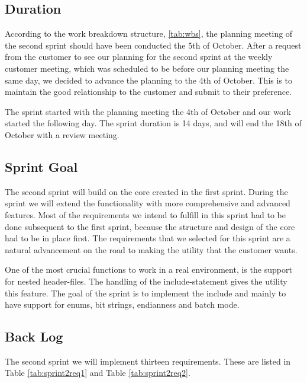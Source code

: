 \subsection{Duration}
According to the work breakdown structure, \autoref{tab:wbs}, the planning meeting of the second sprint should have been conducted the 5th of October. After a request from the customer to see our planning for the second sprint at the weekly customer meeting, which was scheduled to be before our planning meeting the same day, we decided to advance the planning to the 4th of October. This is to maintain the good relationship to the customer and submit to their preference.

The sprint started with the planning meeting the 4th of October and our work started the following day. The sprint duration is 14 days, and will end the 18th of October with a review meeting.  

\subsection{Sprint Goal}
The second sprint will build on the core created in the first sprint. During the sprint we will extend the functionality with more comprehensive and advanced features. Most of the requirements we intend to fulfill in this sprint had to be done subsequent to the first sprint, because the structure and design of the core had to be in place first. The requirements that we selected for this sprint are a natural advancement on the road to making the \gls{utility} that the customer wants. 

One of the most crucial functions to work in a real environment, is the support for nested \gls{header}-files. The handling of the \gls{include}-statement gives the \gls{utility} this feature. The goal of the sprint is to implement the \gls{include} and mainly to have support for \glspl{enum}, \glspl{bit string}, \gls{endianness} and \gls{batch mode}. 

\subsection{Back Log}
\label{sec:sp2backlog}
The second sprint we will implement thirteen requirements. These are listed in Table
\ref{tab:sprint2req1} and Table \ref{tab:sprint2req2}.


